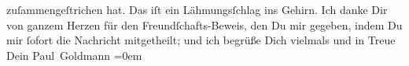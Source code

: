 \begin{ledgroupsized}[t]{13cm}
               zuſammengeſtrichen hat. Das iſt ein Lähmungsſchlag ins Gehirn.\pend
           \pstart
           Ich danke Dir von ganzem Herzen für den Freundſchafts-Beweis, den Du mir
               gegeben, indem Du mir ſofort die {\pb}Nachricht
               mitgetheilt; und ich begrüße Dich vielmals und in Treue {\\[\baselineskip]}Dein \spacefill\mbox{Paul
                  Goldmann}\pend
           \leftskip=0em{}\endnumbering{}\end{ledgroupsized}\begin{anhang}\end{anhang}\newcommand{\dateiname}{L02618}\newcommand{\titel}{Paul Goldmann an Arthur Schnitzler, 3. 11. [1894]}\newcommand{\editorInnen}{Martin Anton Müller und Laura Untner}
      